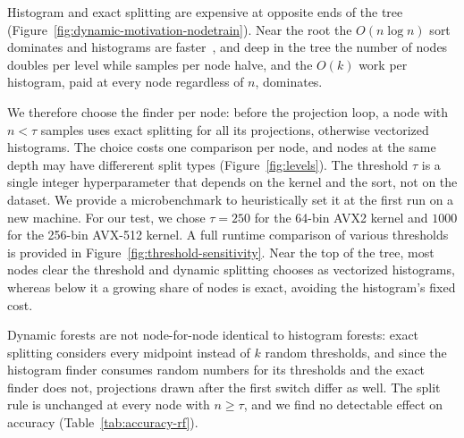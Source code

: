 \documentclass[sigconf,anonymous,review]{acmart}
\begin{document}
Histogram and exact splitting are expensive at opposite ends of the tree (Figure~\ref{fig:dynamic-motivation-nodetrain}). Near the root the $O(n\log n)$ sort dominates and histograms are faster~\cite{ydf,prokhorenkova2018catboost}, and deep in the tree the number of nodes doubles per level while samples per node halve, and the $O(k)$ work per histogram, paid at every node regardless of $n$, dominates.

We therefore choose the finder per node: before the projection loop, a node with $n<\tau$ samples uses exact splitting for all its projections, otherwise vectorized histograms. The choice costs one comparison per node, and nodes at the same depth may have differerent split types (Figure~\ref{fig:levels}). The threshold $\tau$ is a single integer hyperparameter that depends on the kernel and the sort, not on the dataset. We provide a microbenchmark to heuristically set it at the first run on a new machine. For our test, we chose $\tau=250$ for the 64-bin AVX2 kernel and $1000$ for the 256-bin AVX-512 kernel. A full runtime comparison of various thresholds is provided in Figure~\ref{fig:threshold-sensitivity}. Near the top of the tree, most nodes clear the threshold and dynamic splitting chooses as vectorized histograms, whereas below it a growing share of nodes is exact, avoiding the histogram's fixed cost.

Dynamic forests are not node-for-node identical to histogram forests: exact splitting considers every midpoint instead of $k$ random thresholds, and since the histogram finder consumes random numbers for its thresholds and the exact finder does not, projections drawn after the first switch differ as well. The split rule is unchanged at every node with $n\ge\tau$, and we find no detectable effect on accuracy (Table~\ref{tab:accuracy-rf}).





\end{document}
